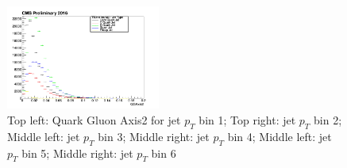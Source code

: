 \begin{figure}[htbp]
\begin{center}
  \includegraphics[width=0.45\textwidth]{sections/mc4/TopTagger/figures/_b_qgaxis2jetptbin5_.png}
 \end{center}
 \caption{Top left: Quark Gluon Axis2 for jet $p_{T}$ bin 1; Top right: jet $p_{T}$ bin 2; Middle left: jet $p_{T}$ bin 3; Middle right: jet $p_{T}$ bin 4; Middle left: jet $p_{T}$ bin 5; Middle right: jet $p_{T}$ bin 6}
 \label{fig:c4ttqgaxis2jetpt}
\end{figure}

\clearpage
